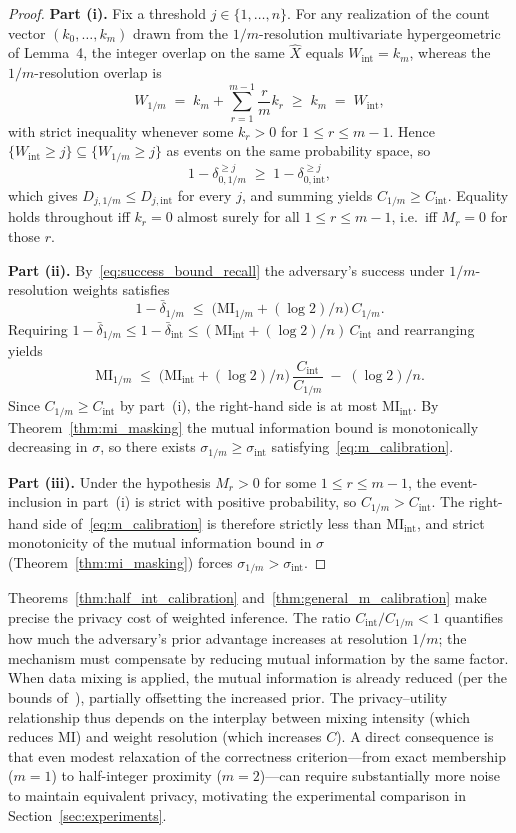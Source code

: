 \documentclass[sigconf,anonymous, review]{acmart}
\newcommand{\MI}{\mathrm{MI}}
\begin{document}
\begin{proof}
\textbf{Part (i).} Fix a threshold $j \in \{1,\dots,n\}$. For any realization of the count vector $(k_0,\dots,k_m)$ drawn from the $1/m$-resolution multivariate hypergeometric of Lemma~4, the integer overlap on the same $\widehat{X}$ equals $W_{\mathrm{int}} = k_m$, whereas the $1/m$-resolution overlap is
\[
W_{1/m}
\;=\;
k_m + \sum_{r=1}^{m-1}\frac{r}{m}k_r
\;\ge\; k_m
\;=\; W_{\mathrm{int}},
\]
with strict inequality whenever some $k_r > 0$ for $1 \le r \le m-1$. Hence $\{W_{\mathrm{int}} \ge j\} \subseteq \{W_{1/m} \ge j\}$ as events on the same probability space, so
\[
1 - \delta_{0,1/m}^{\ge j}
\;\ge\;
1 - \delta_{0,\mathrm{int}}^{\ge j},
\]
which gives $D_{j,1/m} \le D_{j,\mathrm{int}}$ for every $j$, and summing yields $C_{1/m} \ge C_{\mathrm{int}}$. Equality holds throughout iff $k_r = 0$ almost surely for all $1 \le r \le m-1$, i.e.\ iff $M_r = 0$ for those $r$.

\textbf{Part (ii).} By~\eqref{eq:success_bound_recall} the adversary's success under $1/m$-resolution weights satisfies
\[
1 - \bar{\delta}_{1/m}
\;\le\;
\big(\MI_{1/m} + (\log 2)/n\big)\, C_{1/m}.
\]
Requiring $1 - \bar{\delta}_{1/m} \le 1 - \bar{\delta}_{\mathrm{int}} \le (\MI_{\mathrm{int}} + (\log 2)/n)\, C_{\mathrm{int}}$ and rearranging yields
\[
\MI_{1/m}
\;\le\;
\big(\MI_{\mathrm{int}} + (\log 2)/n\big)\,\frac{C_{\mathrm{int}}}{C_{1/m}}
\;-\; (\log 2)/n.
\]
Since $C_{1/m} \ge C_{\mathrm{int}}$ by part~(i), the right-hand side is at most $\MI_{\mathrm{int}}$. By Theorem~\ref{thm:mi_masking} the mutual information bound is monotonically decreasing in $\sigma$, so there exists $\sigma_{1/m} \ge \sigma_{\mathrm{int}}$ satisfying~\eqref{eq:m_calibration}.

\textbf{Part (iii).} Under the hypothesis $M_r > 0$ for some $1 \le r \le m-1$, the event-inclusion in part~(i) is strict with positive probability, so $C_{1/m} > C_{\mathrm{int}}$. The right-hand side of~\eqref{eq:m_calibration} is therefore strictly less than $\MI_{\mathrm{int}}$, and strict monotonicity of the mutual information bound in $\sigma$ (Theorem~\ref{thm:mi_masking}) forces $\sigma_{1/m} > \sigma_{\mathrm{int}}$.
\end{proof}

Theorems~\ref{thm:half_int_calibration} and~\ref{thm:general_m_calibration} make precise the privacy cost of weighted inference. The ratio $C_{\mathrm{int}}/C_{1/m} < 1$ quantifies how much the adversary's prior advantage increases at resolution $1/m$; the mechanism must compensate by reducing mutual information by the same factor. When data mixing is applied, the mutual information is already reduced (per the bounds of~\cite{xiao2024formal}), partially offsetting the increased prior. The privacy--utility relationship thus depends on the interplay between mixing intensity (which reduces $\MI$) and weight resolution (which increases $C$). A direct consequence is that even modest relaxation of the correctness criterion---from exact membership ($m=1$) to half-integer proximity ($m=2$)---can require substantially more noise to maintain equivalent privacy, motivating the experimental comparison in Section~\ref{sec:experiments}.
\end{document}
